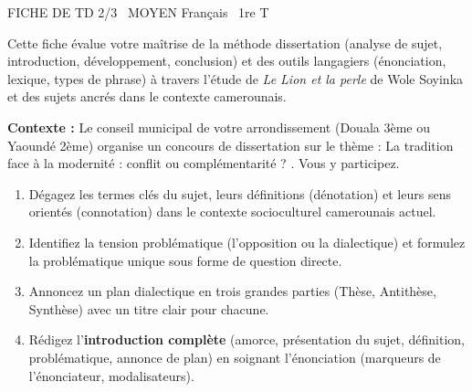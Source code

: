 \documentclass[11pt]{article}
\begin{document}
\begin{tcolorbox}[enhanced,colback=popink,colframe=popink,arc=10pt,boxrule=0pt,left=12pt,right=12pt,top=9pt,bottom=9pt]
{\color{white}\popxbold\small FICHE DE TD 2/3 \textbullet\ MOYEN \hfill Français \textbullet\ 1re T\par}
\end{tcolorbox}
\vspace{4pt}
\noindent Cette fiche évalue votre maîtrise de la méthode dissertation (analyse de sujet, introduction, développement, conclusion) et des outils langagiers (énonciation, lexique, types de phrase) à travers l'étude de \textit{Le Lion et la perle} de Wole Soyinka et des sujets ancrés dans le contexte camerounais.

\begin{exercice}
\textbf{Contexte :} Le conseil municipal de votre arrondissement (Douala 3ème ou Yaoundé 2ème) organise un concours de dissertation sur le thème : \og La tradition face à la modernité : conflit ou complémentarité ? \fg{}. Vous y participez.
\begin{enumerate}
    \item Dégagez les termes clés du sujet, leurs définitions (dénotation) et leurs sens orientés (connotation) dans le contexte socioculturel camerounais actuel.
    \item Identifiez la tension problématique (l'opposition ou la dialectique) et formulez la problématique unique sous forme de question directe.
    \item Annoncez un plan dialectique en trois grandes parties (Thèse, Antithèse, Synthèse) avec un titre clair pour chacune.
    \item Rédigez l'\textbf{introduction complète} (amorce, présentation du sujet, définition, problématique, annonce de plan) en soignant l'énonciation (marqueurs de l'énonciateur, modalisateurs).
\end{enumerate}
\end{exercice}
\end{document}
